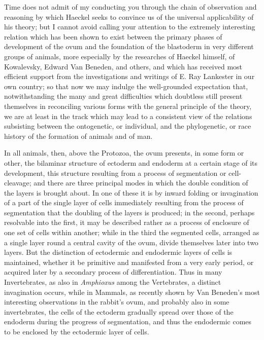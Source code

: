 \documentclass[a4paper, 11pt, oneside, english]{article}
\begin{document}
Time does not admit of my conducting you through the chain of observation and reasoning by which Haeckel seeks to convince us of the universal applicability of his theory; but I cannot avoid calling your attention to the extremely interesting relation which has been shown to exist between the primary phases of development of the ovum and the foundation of the blastoderm in very different groups of animals, more especially by the researches of Haeckel himself, of Kowalevsky, Edward Van Beneden, and others, and which has received most efficient support from the investigations and writings of E. Ray Lankester in our own country; so that now we may indulge the well-grounded expectation that, notwithstanding the many and great difficulties which doubtless still present themselves in reconciling various forms with the general principle of the theory, we are at least in the track which may lead to a consistent view of the relations subsisting between the ontogenetic, or individual, and the phylogenetic, or race history of the formation of animals and of man.

In all animals, then, above the Protozoa, the ovum presents, in some form or other, the bilaminar structure of ectoderm and endoderm at a certain stage of its development, this structure resulting from a process of segmentation or cell-cleavage; and there are three principal modes in which the double condition of the layers is brought about. In one of these it is by inward folding or invagination of a part of the single layer of cells immediately resulting from the process of segmentation that the doubling of the layers is produced; in the second, perhaps resolvable into the first, it may be described rather as a process of enclosure of one set of cells within another; while in the third the segmented cells, arranged as a single layer round a central cavity of the ovum, divide themselves later into two layers. But the distinction of ectodermic and endodermic layers of cells is maintained, whether it be primitive and manifested from a very early period, or acquired later by a secondary process of differentiation. Thus in many Invertebrates, as also in \emph{Amphioxus} among the Vertebrates, a distinct invagination occurs, while in Mammals, as recently shown by Van Beneden's most interesting observations in the rabbit's ovum, and probably also in some invertebrates, the cells of the ectoderm gradually spread over those of the endoderm during the progress of segmentation, and thus the endodermic comes to be enclosed by the ectodermic layer of cells.
\end{document}
